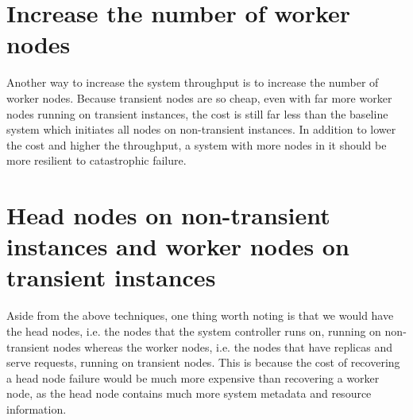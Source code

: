 \documentclass{article}
\begin{document}
\section{Increase the number of worker nodes}
Another way to increase the system throughput is to increase the number of worker nodes. Because transient nodes are so cheap, even with far more worker nodes running on transient instances, the cost is still far less than the baseline system which initiates all nodes on non-transient instances. In addition to lower the cost and higher the throughput, a system with more nodes in it should be more resilient to catastrophic failure.

\section{Head nodes on non-transient instances and worker nodes on transient instances}
Aside from the above techniques, one thing worth noting is that we would have the head nodes, i.e. the nodes that the system controller runs on, running on non-transient nodes whereas the worker nodes, i.e. the nodes that have replicas and serve requests, running on transient nodes. This is because the cost of recovering a head node failure would be much more expensive than recovering a worker node, as the head node contains much more system metadata and resource information.
 
\end{document}
